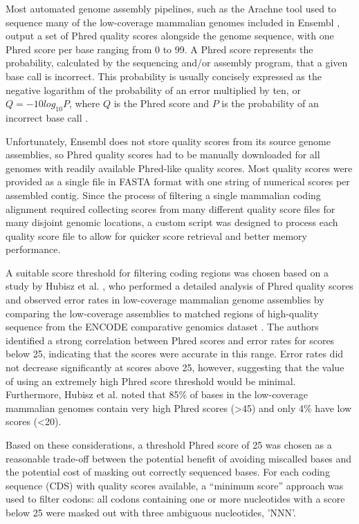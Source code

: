 Most automated genome assembly pipelines, such as the Arachne tool
used to sequence many of the low-coverage mammalian genomes included
in Ensembl \citep{Jaffe2003}, output a set of Phred quality scores
alongside the genome sequence, with one Phred score per base ranging
from 0 to 99. A Phred score represents the probability, calculated by
the sequencing and/or assembly program, that a given base call is
incorrect. This probability is usually concisely expressed as the
negative logarithm of the probability of an error multiplied by ten,
or $Q=-10log_{10}P$, where $Q$ is the Phred score and $P$ is the
probability of an incorrect base call \citep{Cock2010}.

Unfortunately, Ensembl does not store quality scores from its source
genome assemblies, so Phred quality scores had to be manually
downloaded for all genomes with readily available Phred-like quality
scores. Most quality scores were provided as a single file in FASTA
format with one string of numerical scores per assembled contig. Since
the process of filtering a single mammalian coding alignment required
collecting scores from many different quality score files for many
disjoint genomic locations, a custom script was designed to process
each quality score file to allow for quicker score retrieval and
better memory performance.

A suitable score threshold for filtering coding regions was chosen
based on a study by Hubisz et al. \citeyearpar{Hubisz2011}, who
performed a detailed analysis of Phred quality scores and observed
error rates in low-coverage mammalian genome assemblies by comparing
the low-coverage assemblies to matched regions of high-quality
sequence from the ENCODE comparative genomics dataset
\citep{ENCODE_Project_Consortium2007a}. The authors identified a
strong correlation between Phred scores and error rates for scores
below 25, indicating that the scores were accurate in this
range. Error rates did not decrease significantly at scores above 25,
however, suggesting that the value of using an extremely high Phred
score threshold would be minimal. Furthermore, Hubisz et al. noted
that 85\% of bases in the low-coverage mammalian genomes contain very
high Phred scores (>45) and only 4\% have low scores (<20).

Based on these considerations, a threshold Phred score of 25 was
chosen as a reasonable trade-off between the potential benefit of
avoiding miscalled bases and the potential cost of masking out
correctly sequenced bases. For each coding sequence (CDS) with quality
scores available, a ``minimum score'' approach was used to filter
codons: all codons containing one or more nucleotides with a score
below 25 were masked out with three ambiguous nucleotides,
'NNN'.

